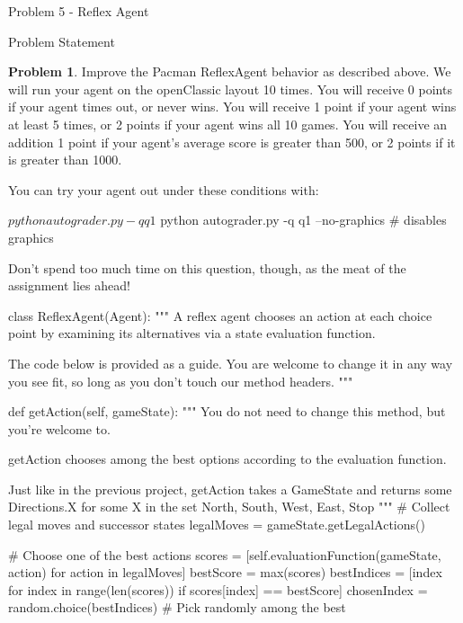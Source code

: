 \begin{problem}{Problem 5 - Reflex Agent}
\begin{statement}{Problem Statement}
        \begin{center}
            \begin{highlightenv}[15cm]
                \textbf{Problem 1}. Improve the Pacman ReflexAgent behavior as described above. We will run your agent on the openClassic layout 10 times. You will receive 0 points if your agent times 
                out, or never wins. You will receive 1 point if your agent wins at least 5 times, or 2 points if your agent wins all 10 games. You will receive an addition 1 point if your agent's average 
                score is greater than 500, or 2 points if it is greater than 1000.
            \end{highlightenv}
        \end{center}

        You can try your agent out under these conditions with:

    \begin{code}[Bash]
    $ python autograder.py -q q1
    $ python autograder.py -q q1 --no-graphics # disables graphics
    \end{code}

        Don't spend too much time on this question, though, as the meat of the assignment lies ahead!
    \end{statement}

    \begin{highlight}[Solution]
    \begin{code}[Python]
    class ReflexAgent(Agent):
    """
        A reflex agent chooses an action at each choice point by examining
        its alternatives via a state evaluation function.

        The code below is provided as a guide.  You are welcome to change
        it in any way you see fit, so long as you don't touch our method
        headers.
    """


    def getAction(self, gameState):
        """
        You do not need to change this method, but you're welcome to.

        getAction chooses among the best options according to the evaluation function.

        Just like in the previous project, getAction takes a GameState and returns
        some Directions.X for some X in the set {North, South, West, East, Stop}
        """
        # Collect legal moves and successor states
        legalMoves = gameState.getLegalActions()

        # Choose one of the best actions
        scores = [self.evaluationFunction(gameState, action) for action in legalMoves]
        bestScore = max(scores)
        bestIndices = [index for index in range(len(scores)) if scores[index] == bestScore]
        chosenIndex = random.choice(bestIndices) # Pick randomly among the best


\end{code}
\end{highlight}
\end{problem}
